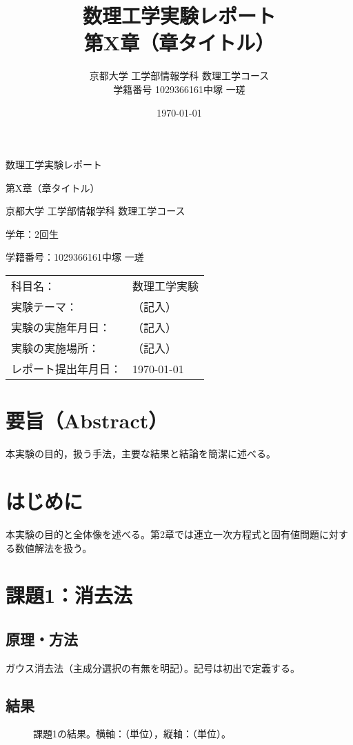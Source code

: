 \documentclass[a4paper,11pt]{ltjsarticle}
\title{数理工学実験レポート\\\vspace{5pt}\large 第X章（章タイトル）}
\author{京都大学 工学部情報学科 数理工学コース\\学籍番号 1029366161\quad 中塚 一瑳}
\date{\today}
\begin{document}
\begin{titlepage}
\centering
{\Large 数理工学実験レポート\par}
\vspace{4mm}
{\large 第X章（章タイトル）\par}
\vspace{15mm}
{\large 京都大学 工学部情報学科 数理工学コース\par}
{\large 学年：2回生\par}
{\large 学籍番号：1029366161\quad 中塚 一瑳\par}
\vspace{10mm}
\begin{tabular}{@{}ll}
科目名： & 数理工学実験 \\
実験テーマ： & （記入） \\
実験の実施年月日： & （記入） \\
実験の実施場所： & （記入） \\
レポート提出年月日： & \today \\
\end{tabular}
\vfill
\end{titlepage}

\section*{要旨（Abstract）}
本実験の目的，扱う手法，主要な結果と結論を簡潔に述べる。

\section{はじめに}
本実験の目的と全体像を述べる。第2章では連立一次方程式と固有値問題に対する数値解法を扱う。

\section{課題1：消去法}
\subsection{原理・方法}
ガウス消去法（主成分選択の有無を明記）。記号は初出で定義する。
\subsection{結果}
\begin{figure}[H]
  \centering
  \caption{課題1の結果。横軸：（単位），縦軸：（単位）。}
  \label{fig:t1}
\end{figure}
\end{document}
